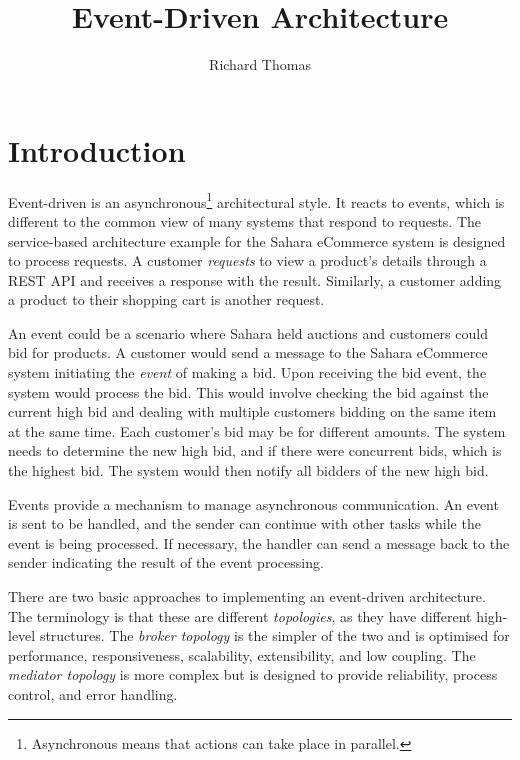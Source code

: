 \title{Event-Driven Architecture}
\author{Richard Thomas}
\date{}

\maketitle

\section{Introduction}

Event-driven is an asynchronous\footnote{Asynchronous means that actions can take place in parallel.} architectural style.
It reacts to events, which is different to the common view of many systems that respond to requests.
The service-based architecture example for the Sahara eCommerce system is designed to process requests.
A customer \emph{requests} to view a product's details through a REST API and receives a response with the result.
Similarly, a customer adding a product to their shopping cart is another request.

An event could be a scenario where Sahara held auctions and customers could bid for products.
A customer would send a message to the Sahara eCommerce system initiating the \emph{event} of making a bid.
Upon receiving the bid event, the system would process the bid.
This would involve checking the bid against the current high bid and dealing with multiple customers bidding on the same item at the same time.
Each customer's bid may be for different amounts.
The system needs to determine the new high bid, and if there were concurrent bids, which is the highest bid.
The system would then notify all bidders of the new high bid.

Events provide a mechanism to manage asynchronous communication.
An event is sent to be handled, and the sender can continue with other tasks while the event is being processed.
If necessary, the handler can send a message back to the sender indicating the result of the event processing.

There are two basic approaches to implementing an event-driven architecture.
The terminology is that these are different \emph{topologies}, as they have different high-level structures.
The \emph{broker topology} is the simpler of the two and is optimised for performance, responsiveness, scalability, extensibility, and low coupling.
The \emph{mediator topology} is more complex but is designed to provide reliability, process control, and error handling.


